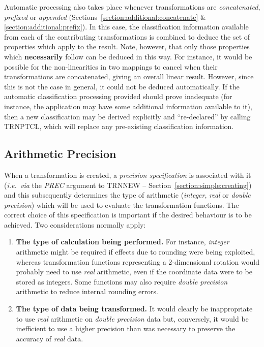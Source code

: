 \documentclass[twoside,11pt]{article}
\newcommand{\xlabel}[1]{}
\renewcommand{\_}{\texttt{\symbol{95}}}
\newcommand{\name}[1]{\mbox{\small{#1}}}
\newcommand{\fortvar}[1]{\mbox{\emph{#1}}}
\begin{document}
Automatic processing also takes place whenever transformations are
\emph{concatenated}, \emph{prefixed} or \emph{appended}
(Sections~\ref{section:additional:concatenate} \&
\ref{section:additional:prefix}).
In this case, the classification information available from each of the
contributing transformations is combined to deduce the set of
properties which apply to the result.
Note, however, that only those properties which \textbf{necessarily} follow can
be deduced in this way.
For instance, it would be possible for the non-linearities in two mappings
to cancel when their transformations are concatenated, giving an overall
linear result.
However, since this is not the case in general, it could not be deduced
automatically.
If the automatic classification processing provided should prove inadequate
(for instance, the application may have some additional information
available to it), then a new classification may be derived explicitly and
``re-declared'' by calling \name{TRN\_PTCL}, which will replace any
pre-existing classification information.


\subsection{\xlabel{arithmetic_precision}Arithmetic Precision}

\label{section:advanced:precision}

When a transformation is created, a \emph{precision specification} is
associated with it (\emph{i.e.\ via} the \fortvar{PREC} argument to
\name{TRN\_NEW} -- Section~\ref{section:simple:creating}) and this
subsequently determines the type of arithmetic (\emph{integer}, \emph{real} or
\emph{double precision}) which will be used to evaluate the transformation
functions.
The correct choice of this specification is important if the desired
behaviour is to be achieved.
Two considerations normally apply:

\begin{enumerate}

\item \textbf{The type of calculation being performed.}
For instance, \emph{integer} arithmetic might be required if effects due to
rounding were being exploited, whereas transformation functions representing
a 2-dimensional rotation would probably need to use \emph{real} arithmetic,
even if the coordinate data were to be stored as integers.
Some functions may also require \emph{double precision} arithmetic to reduce
internal rounding errors.

\item \textbf{The type of data being transformed.}
It would clearly be inappropriate to use \emph{real} arithmetic on \emph{double precision} data but, conversely, it would be inefficient to use a
higher precision than was necessary to preserve the accuracy of \emph{real}
data.

\end{enumerate}
\end{document}
